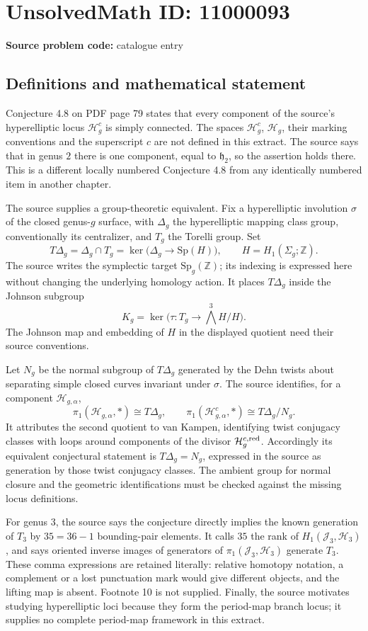 \documentclass[11pt]{article}
\newcommand{\Z}{\mathbb{Z}}
\begin{document}
\section*{UnsolvedMath ID: 11000093}
\textbf{Source problem code:} catalogue entry
\subsection{Definitions and mathematical statement}
Conjecture 4.8 on PDF page 79 states that every component of the source's hyperelliptic locus \(\mathcal H_g^c\) is simply connected. The spaces \(\mathcal H_g^c\), \(\mathcal H_g\), their marking conventions and the superscript \(c\) are not defined in this extract. The source says that in genus \(2\) there is one component, equal to \(\mathfrak h_2\), so the assertion holds there. This is a different locally numbered Conjecture 4.8 from any identically numbered item in another chapter.

The source supplies a group-theoretic equivalent. Fix a hyperelliptic involution \(\sigma\) of the closed genus-\(g\) surface, with \(\Delta_g\) the hyperelliptic mapping class group, conventionally its centralizer, and \(T_g\) the Torelli group. Set
\[
 T\Delta_g=\Delta_g\cap T_g
       =\ker\bigl(\Delta_g\to\mathrm{Sp}(H)\bigr),
 \qquad H=H_1(\Sigma_g;\Z).
\]
The source writes the symplectic target \(\mathrm{Sp}_g(\Z)\); its indexing is expressed here without changing the underlying homology action. It places \(T\Delta_g\) inside the Johnson subgroup
\[
 K_g=\ker\bigl(\tau:T_g\to\bigwedge^3H/H\bigr).
\]
The Johnson map and embedding of \(H\) in the displayed quotient need their source conventions.

Let \(N_g\) be the normal subgroup of \(T\Delta_g\) generated by the Dehn twists about separating simple closed curves invariant under \(\sigma\). The source identifies, for a component \(\mathcal H_{g,\alpha}\),
\[
 \pi_1(\mathcal H_{g,\alpha},*)\cong T\Delta_g,
 \qquad
 \pi_1(\mathcal H_{g,\alpha}^c,*)\cong T\Delta_g/N_g.
\]
It attributes the second quotient to van Kampen, identifying twist conjugacy classes with loops around components of the divisor \(\mathcal H_g^{c,\rm red}\). Accordingly its equivalent conjectural statement is \(T\Delta_g=N_g\), expressed in the source as generation by those twist conjugacy classes. The ambient group for normal closure and the geometric identifications must be checked against the missing locus definitions.

For genus \(3\), the source says the conjecture directly implies the known generation of \(T_3\) by \(35=36-1\) bounding-pair elements. It calls \(35\) the rank of \(H_1(\mathcal J_3,\mathcal H_3)\), and says oriented inverse images of generators of \(\pi_1(\mathcal J_3,\mathcal H_3)\) generate \(T_3\). These comma expressions are retained literally: relative homotopy notation, a complement or a lost punctuation mark would give different objects, and the lifting map is absent. Footnote 10 is not supplied. Finally, the source motivates studying hyperelliptic loci because they form the period-map branch locus; it supplies no complete period-map framework in this extract.
\end{document}
